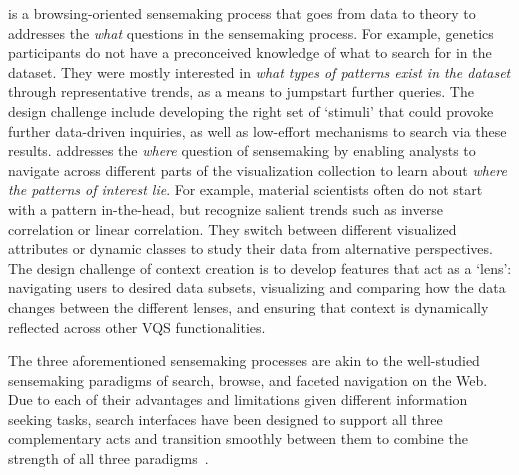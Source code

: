  is
a browsing-oriented sensemaking process
that goes from data to theory to
addresses the \textit{what} questions
in the sensemaking process.
 For example, genetics participants do not
 have a preconceived knowledge of what to search
 for in the dataset.
 They were mostly interested in
 \textit{what types of patterns exist in the dataset}
 through representative trends, as a means to
 jumpstart further queries. %
The design challenge include developing
the right set of `stimuli' that could
provoke further data-driven inquiries,
as well as low-effort mechanisms to search via these results.
 addresses the \textit{where}
question of sensemaking by enabling analysts
to navigate across different parts of the visualization
collection to learn about \textit{where the patterns of interest lie}.
For example, material scientists often do not start
with a pattern in-the-head, but recognize salient
trends such as inverse correlation or linear correlation.
They switch between different visualized attributes or dynamic
classes to study their data from alternative perspectives.
The design challenge of context creation is to develop
features that act as a `lens': navigating users to desired data subsets,
visualizing and comparing how the data changes between the different lenses, and ensuring that context is dynamically reflected across other VQS functionalities.
\par\noindent The three aforementioned sensemaking processes are akin to the well-studied sensemaking paradigms of search, browse, and faceted navigation on the Web. Due to each of their advantages and limitations given different information seeking tasks, search interfaces have been designed to support all three complementary acts and transition smoothly between them to combine the strength of all three paradigms~\cite{Hearst2009,Olston2003}.
